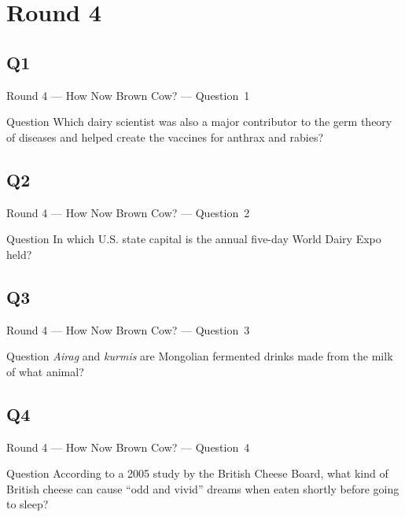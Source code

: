 \documentclass[11pt]{beamer}
\begin{document}
\section{Round 4}
\subsection*{Q1}
\begin{frame}[t]{Round 4 --- How Now Brown Cow? --- \mbox{Question 1}}
\vspace{-0.5em}
\begin{block}{Question}
Which dairy scientist was also a major contributor to the germ theory of diseases and helped create the vaccines for anthrax and rabies?
\end{block}
\end{frame}
\subsection*{Q2}
\begin{frame}[t]{Round 4 --- How Now Brown Cow? --- \mbox{Question 2}}
\vspace{-0.5em}
\begin{block}{Question}
In which U.S. state capital is the annual five-day World Dairy Expo held?
\end{block}
\end{frame}
\subsection*{Q3}
\begin{frame}[t]{Round 4 --- How Now Brown Cow? --- \mbox{Question 3}}
\vspace{-0.5em}
\begin{block}{Question}
\emph{Airag} and \emph{kurmis} are Mongolian fermented drinks made from the milk of what animal?
\end{block}
\end{frame}
\subsection*{Q4}
\begin{frame}[t]{Round 4 --- How Now Brown Cow? --- \mbox{Question 4}}
\vspace{-0.5em}
\begin{block}{Question}
According to a 2005 study by the British Cheese Board, what kind of British cheese can cause ``odd and vivid'' dreams when eaten shortly before going to sleep?
\end{block}
\end{frame}
\end{document}
